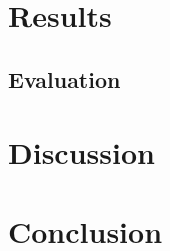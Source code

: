 \documentclass[12pt,a4paper]{report}
\begin{document}
\chapter{Results}
\label{sec:results}

\section{Evaluation}
\label{subsec:evaluation}


\chapter{Discussion}
\label{sec:dicussion}


\chapter{Conclusion}
\label{sec:conclusion}


\printbibliography

\appendix
\end{document}
